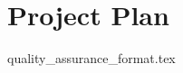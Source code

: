 \documentclass{article}
\begin{document}

\section*{Project Plan}
{quality_assurance_format.tex}




\end{document}
